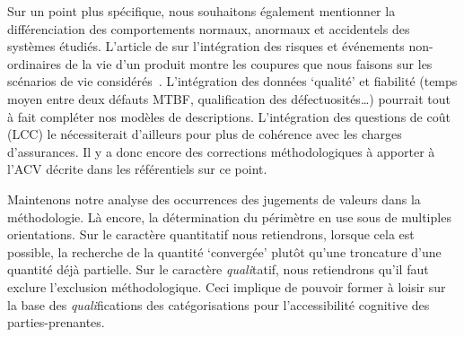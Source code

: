Sur un point plus spécifique, nous souhaitons également mentionner la différenciation des comportements normaux, anormaux et accidentels des systèmes étudiés.
L'article de \citeauthor{plumblee_marlos_2014} sur l'intégration des risques et événements non-ordinaires de la vie d'un produit montre les coupures que nous faisons sur les scénarios de vie considérés~\cite{plumblee_marlos_2014}.
L'intégration des données `qualité' et fiabilité (temps moyen entre deux défauts MTBF, qualification des défectuosités\ldots) pourrait tout à fait compléter nos modèles de descriptions.
L'intégration des questions de coût (LCC) le nécessiterait d'ailleurs pour plus de cohérence avec les charges d'assurances.
Il y a donc encore des corrections méthodologiques à apporter à l'ACV décrite dans les référentiels sur ce point.

Maintenons notre analyse des occurrences des jugements de valeurs dans la méthodologie.
Là encore, la détermination du périmètre en use sous de multiples orientations.
Sur le caractère quantitatif nous retiendrons, lorsque cela est possible, la recherche de la quantité `convergée' plutôt qu'une troncature d'une quantité déjà partielle.
Sur le caractère \emph{quali}tatif, nous retiendrons qu'il faut exclure l'exclusion méthodologique.
Ceci implique de pouvoir former à loisir sur la base des \emph{quali}fications des catégorisations pour l'accessibilité cognitive des parties-prenantes.
